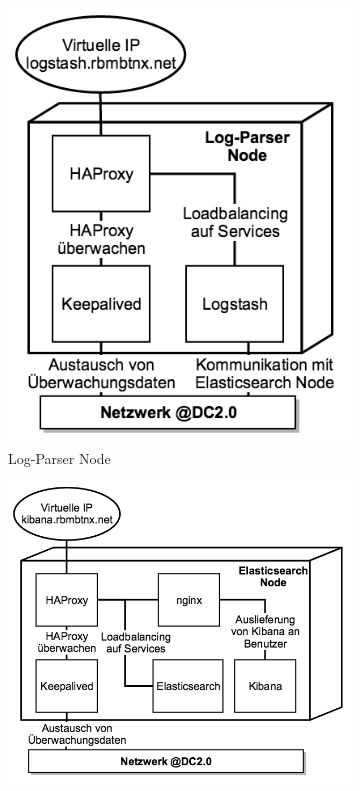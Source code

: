 \begin{figure}[ht]
	\centering
    \begin{subfigure}[b]{0.40\textwidth}
    		\includegraphics[width=\textwidth]{img/logstash_parser_node.png}
        \caption{Log-Parser Node}
        \label{fig:logstash:parsernode}
    \end{subfigure}
    \begin{subfigure}[b]{0.585\textwidth}
        \includegraphics[width=\textwidth]{img/logstash_es_node.png}

\end{subfigure}
\end{figure}
